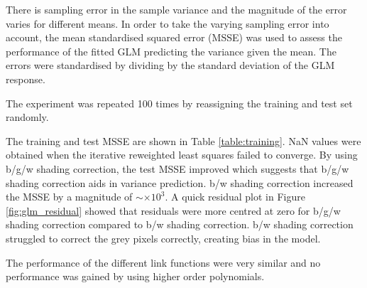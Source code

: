 \documentclass[a4paper]{proc}
\begin{document}
There is sampling error in the sample variance and the magnitude of the error varies for different means. In order to take the varying sampling error into account, the mean standardised squared error (MSSE) was used to assess the performance of the fitted GLM predicting the variance given the mean. The errors were standardised by dividing by the standard deviation of the GLM response.

The experiment was repeated 100 times by reassigning the training and test set randomly.

The training and test MSSE are shown in Table \ref{table:training}. NaN values were obtained when the iterative reweighted least squares failed to converge. By using b/g/w shading correction, the test MSSE improved which suggests that b/g/w shading correction aids in variance prediction. b/w shading correction increased the MSSE by a magnitude of $\sim\times10^3$. A quick residual plot in Figure \ref{fig:glm_residual} showed that residuals were more centred at zero for b/g/w shading correction compared to b/w shading correction. b/w shading correction struggled to correct the grey pixels correctly, creating bias in the model.

The performance of the different link functions were very similar and no performance was gained by using higher order polynomials.

\end{document}
